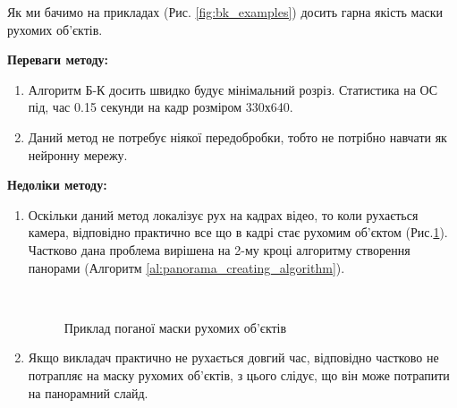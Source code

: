 Як ми бачимо на прикладах (Рис. \ref{fig:bk_examples}) досить гарна якість маски рухомих об'єктів.

\textbf{Переваги методу:}
\begin{enumerate}
    \item Алгоритм Б-К досить швидко будує мінімальний розріз. Статистика на ОС
          під, час 0.15 секунди на кадр розміром 330х640.
    \item Даний метод не потребує ніякої передобробки, тобто не потрібно навчати
          як нейронну мережу.
\end{enumerate}

\textbf{Недоліки методу:}
\begin{enumerate}
    \item Оскільки даний метод локалізує рух на кадрах відео, то коли
          рухається камера, відповідно практично все що в кадрі стає рухомим об'єктом
          (Рис.\ref{fig:bk_bad_mask}).
          Частково дана проблема вирішена на 2-му кроці алгоритму створення панорами
          (Алгоритм \ref{al:panorama_creating_algorithm}).
          \begin{figure}[H]
              \centering

               \\
              \caption{Приклад поганої маски рухомих об'єктів
                  \label{fig:bk_bad_mask}
              }
          \end{figure}

    \item Якщо викладач практично не рухається довгий час, відповідно частково не потрапляє
          на маску рухомих об'єктів, з цього слідує, що він може потрапити на панорамний слайд.
\end{enumerate}


